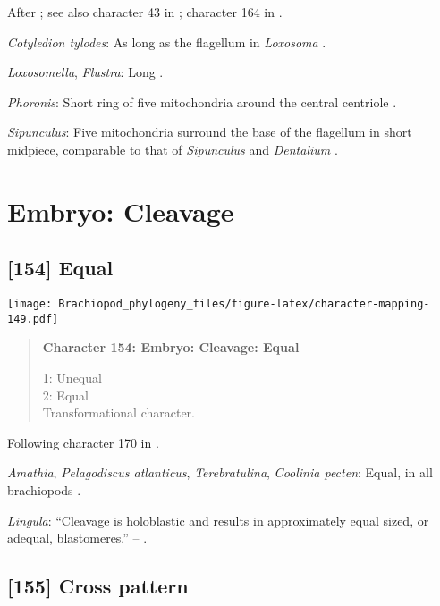 \documentclass[openany]{book}
\theoremstyle{definition}
\theoremstyle{definition}
\theoremstyle{definition}
\theoremstyle{remark}
\begin{document}
After \citet{Smith2012}; see also character 43 in \citet{Ponder1997};
character 164 in \citet{Giribet2002}.

\hypertarget{Cotyledion_tylodes-coding-153}{}
\emph{Cotyledion tylodes}: As long as the flagellum in \emph{Loxosoma}
\citep{Franzen2000}.

\hypertarget{Flustra-coding-153}{}
\emph{Loxosomella}, \emph{Flustra}: Long \citep{Franzen1981}.

\hypertarget{Phoronis-coding-153}{}
\emph{Phoronis}: Short ring of five mitochondria around the central
centriole \citep{Rice1993}.

\hypertarget{Sipunculus-coding-153}{}
\emph{Sipunculus}: Five mitochondria surround the base of the flagellum
in short midpiece, comparable to that of \emph{Sipunculus} and
\emph{Dentalium} \citep{Gherardi2011}.

\section{Embryo: Cleavage}\label{embryo-cleavage}

\subsection*{{[}154{]} Equal}\label{equal}

\texttt{[image: Brachiopod\_phylogeny\_files/figure-latex/character-mapping-149.pdf]}

\begin{quote}
\textbf{Character 154: Embryo: Cleavage: Equal}

1: Unequal\\
2: Equal\\
Transformational character.
\end{quote}

Following character 170 in \citet{Giribet2002}.

\hypertarget{Amathia-coding-154}{}
\emph{Amathia}, \emph{Pelagodiscus atlanticus}, \emph{Terebratulina},
\emph{Coolinia pecten}: Equal, in all brachiopods
\citep{Williams1997Introduction}.

\hypertarget{Lingula-coding-154}{}
\emph{Lingula}: ``Cleavage is holoblastic and results in approximately
equal sized, or adequal, blastomeres.'' -- \citet{Pennerstorfer2012}.

\subsection*{{[}155{]} Cross pattern}\label{cross-pattern}
\end{document}
